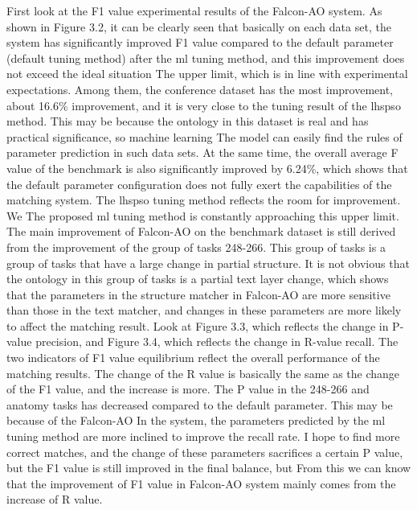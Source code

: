 \documentclass[twoside]{article}
\begin{document}
First look at the F1 value experimental results of the Falcon-AO system.
As shown in Figure 3.2, it can be clearly seen that basically on each data set, the system has significantly improved F1 value compared to the default parameter (default tuning method) after the ml tuning method, and this improvement does not exceed the ideal situation The upper limit, which is in line with experimental expectations.
Among them, the conference dataset has the most improvement, about 16.6\% improvement, and it is very close to the tuning result of the lhspso method. This may be because the ontology in this dataset is real and has practical significance, so machine learning The model can easily find the rules of parameter prediction in such data sets.
At the same time, the overall average F value of the benchmark is also significantly improved by 6.24\%, which shows that the default parameter configuration does not fully exert the capabilities of the matching system. The lhspso tuning method reflects the room for improvement. We The proposed ml tuning method is constantly approaching this upper limit.
The main improvement of Falcon-AO on the benchmark dataset is still derived from the improvement of the group of tasks 248-266. This group of tasks is a group of tasks that have a large change in partial structure. It is not obvious that the ontology in this group of tasks is a partial text layer change, which shows that the parameters in the structure matcher in Falcon-AO are more sensitive than those in the text matcher, and changes in these parameters are more likely to affect the matching result. Look at Figure 3.3, which reflects the change in P-value precision, and Figure 3.4, which reflects the change in R-value recall.
The two indicators of F1 value equilibrium reflect the overall performance of the matching results. The change of the R value is basically the same as the change of the F1 value, and the increase is more. The P value in the 248-266 and anatomy tasks has decreased compared to the default parameter. This may be because of the Falcon-AO
In the system, the parameters predicted by the ml tuning method are more inclined to improve the recall rate. I hope to find more correct matches, and the change of these parameters sacrifices a certain P value, but the F1 value is still improved in the final balance, but From this we can know that the improvement of F1 value in Falcon-AO system mainly comes from the increase of R value.
\end{document}
